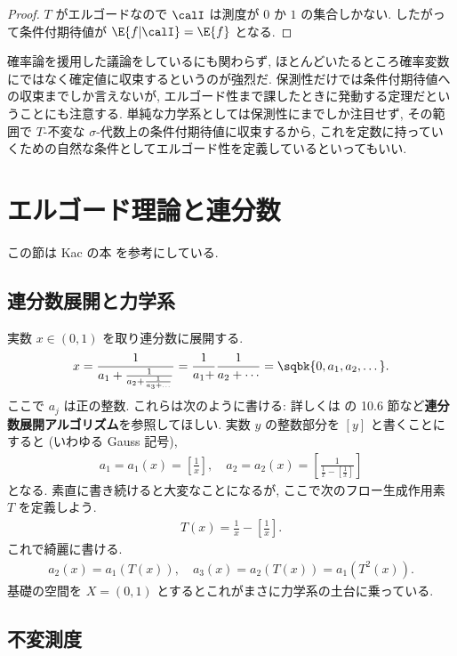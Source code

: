 \documentclass[openany, a4paper, oneside]{jsbook}
\begin{document}
\begin{proof}
$T$ がエルゴードなので $\calI$ は測度が $0$ か $1$ の集合しかない.
したがって条件付期待値が $\E{f | \calI} = \E{f}$ となる.
\end{proof}
\begin{rem}
確率論を援用した議論をしているにも関わらず,
ほとんどいたるところ確率変数にではなく確定値に収束するというのが強烈だ.
保測性だけでは条件付期待値への収束までしか言えないが,
エルゴード性まで課したときに発動する定理だということにも注意する.
単純な力学系としては保測性にまでしか注目せず,
その範囲で $T$-不変な $\sigma$-代数上の条件付期待値に収束するから,
これを定数に持っていくための自然な条件としてエルゴード性を定義しているといってもいい.
\end{rem}
\section{エルゴード理論と連分数\label{introduction-to-ergodic-theory14}}

この節は Kac の本 \cite{MarkKac1} を参考にしている.
\subsection{連分数展開と力学系}

実数 $x \in (0, 1)$ を取り連分数に展開する.
\begin{align}
 x
 =
 \frac{1}{a_1 + \frac{1}{a_2 + \frac{1}{a_3 + \dots}}}
 =
 \frac{1}{a_1+} \frac{1}{a_2+\cdots}
 =
 \sqbk{0, a_1, a_2, \dots}.
\end{align}
ここで $a_j$ は正の整数.
これらは次のように書ける: 詳しくは \cite{HardyWright1} の 10.6 節など\textbf{連分数展開アルゴリズム}を参照してほしい.
実数 $y$ の整数部分を $[y]$ と書くことにすると (いわゆる Gauss 記号),
\begin{align}
 a_1
 =
 a_1(x)
 =
 \left[ \frac{1}{x} \right], \quad
 a_2
 =
 a_2(x)
 =
 \left[ \frac{1}{\frac{1}{x} - \left[ \frac{1}{x} \right]} \right]
\end{align}
となる.
素直に書き続けると大変なことになるが,
ここで次のフロー生成作用素 $T$ を定義しよう.
\begin{align}
 T(x)
 =
 \frac{1}{x} - \left[ \frac{1}{x} \right].
\end{align}
これで綺麗に書ける.
\begin{align}
 a_2(x)
 =
 a_1(T(x)), \quad
 a_3(x)
 =
 a_2(T(x))
 =
 a_1(T^2(x)).
\end{align}
基礎の空間を $X = (0, 1)$ とするとこれがまさに力学系の土台に乗っている.
\subsection{不変測度\label{introduction-to-ergodic-theory29}}
\end{document}
